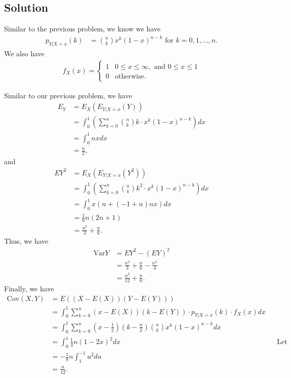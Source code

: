 \documentclass[10pt,a4paper]{article}
\theoremstyle{theorem}
\theoremstyle{definition}
\begin{document}
\subsection*{Solution}
Similar to the previous problem, we know we have
\begin{align*}
p_{Y | X = x}(k) &= {n \choose k} x^k (1 - x)^{n - k} \text{ for } k = 0, 1, ..., n.
\end{align*}
We also have 
\begin{align*}
f_X(x) = \begin{cases} 
      1& 0 \leq x \leq \infty, \text{ and } 0 \leq x \leq 1 \\
      0 & \text{otherwise.}
   \end{cases}
\end{align*}

Similar to our previous problem, we have
\begin{align*}
E_Y &= E_{X}(E_{Y|X = x}(Y))\\
&= \int_0^1 \left(\sum_{k=0}^n  {n \choose k} k \cdot x^k (1 - x)^{n - k} \right) dx\\
&= \int_0^1 nx dx\\
&= \boxed{ \frac{n}{2}},
\end{align*}
and
\begin{align*}
EY^2 &= E_{X}(E_{Y|X = x}(Y^2))\\
&= \int_0^1 \left(\sum_{k=0}^n  {n \choose k} k^2 \cdot x^k (1 - x)^{n - k} \right) dx\\
&= \int_0^1 x (n + (-1 + n) n x) dx\\
&= \frac{1}{6} n (2n + 1)\\
&= \frac{n^2}{3} + \frac{n}{6}.
\end{align*}
Thus, we have
\begin{align*}
\text{Var}Y &= EY^2 - (EY)^2\\
&= \frac{n^2}{3} + \frac{n}{6} - \frac{n^2}{4}\\
&= \boxed{ \frac{n^2}{12} + \frac{n}{6}}.
\end{align*}
Finally, we have
\begin{align*}
\text{Cov}(X, Y) &= E((X - E(X))(Y - E(Y)))\\
&= \int_0^1 \sum_{k=0}^n (x - E(X))(k - E(Y))\cdot  p_{Y | X = x}(k) \cdot f_X(x) dx\\
&= \int_0^1 \sum_{k=0}^n \left(x - \frac{1}{2}\right)\left(k - \frac{n}{2}\right){n \choose k} x^k (1 - x)^{n - k} dx\\
&= \int_0^1 \frac{1}{4} n (1 - 2x)^2 dx && \text{Let u = 1 - 2x}\\
&= - \frac{1}{8} n \int_1^{-1} u^2 du\\
&=  \boxed{\frac{n}{12}}.
\end{align*}
\end{document}
